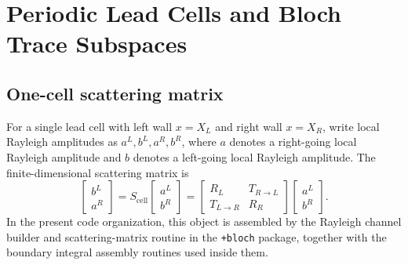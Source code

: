 %
%
%
%
%

\section{Periodic Lead Cells and Bloch Trace Subspaces}

\subsection{One-cell scattering matrix}

For a single lead cell with left wall \(x=X_L\) and right wall \(x=X_R\), write
local Rayleigh amplitudes as \(a^L,b^L,a^R,b^R\), where \(a\) denotes a
right-going local Rayleigh amplitude and \(b\) denotes a left-going local
Rayleigh amplitude.  The finite-dimensional scattering matrix is
\[
  \begin{bmatrix}
  b^L\\
  a^R
  \end{bmatrix}
  =
  S_{\mathrm{cell}}
  \begin{bmatrix}
  a^L\\
  b^R
  \end{bmatrix}
  =
  \begin{bmatrix}
  R_L & T_{R\to L}\\
  T_{L\to R} & R_R
  \end{bmatrix}
  \begin{bmatrix}
  a^L\\
  b^R
  \end{bmatrix}.
\]
In the present code organization, this object is assembled by the Rayleigh
channel builder and scattering-matrix routine in the \texttt{+bloch} package,
together with the boundary integral assembly routines used inside them.


